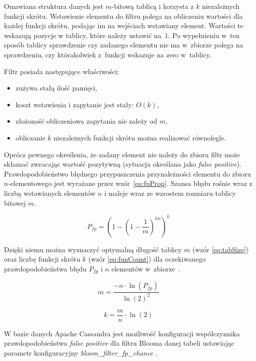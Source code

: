 Omawiana struktura danych jest $m$-bitową tablicą i korzysta z $k$ niezależnych funkcji skrótu.
Wstawienie elementu do filtru polega na obliczeniu wartości dla każdej funkcji skrótu, podając im na wejściach wstawiany element.
Wartości te wskazują pozycje w tablicy, które należy ustawić na~$1$.
Po wypełnieniu w~ten sposób tablicy sprawdzenie czy zadanego elementu nie ma w~zbiorze polega na sprawdzeniu, czy którakolwiek z~funkcji wskazuje na zero w~tablicy.

Filtr posiada następujące właściwości:
\begin{itemize}
    \item zużywa stałą ilość pamięci,
    \item koszt wstawienia i zapytanie jest stały: $O(k)$,
    \item złożoność obliczeniowa zapytania nie zależy od $m$,
    \item obliczanie $k$ niezależnych funkcji skrótu można realizować równolegle.
\end{itemize}

Oprócz pewnego określenia, że zadany element nie należy do zbioru filtr może skłamać zwracając wartość pozytywną (sytuacja określana jako \textit{false positive}).
Prawdopodobieństwo  błędnego  przypuszczenia  przynależności  elementu do zbioru $n$-elementowego jest wyrażane przez wzór~\ref{eq:fpProp}.
Szansa błędu rośnie wraz z liczbą wstawianych elementów $n$ i maleje wraz ze wzrostem rozmiaru tablicy bitowej $m$.

\begin{equation} \label{eq:fpProp}
    P_{fp} = \left(1 - \left(1 - \frac{1}{m}\right)^{kn}\right)^k
\end{equation}

Dzięki niemu można wyznaczyć optymalną długość tablicy $m$ (wzór \ref{eq:tabSize}) oraz liczbę funkcji skrótu $k$ (wzór \ref{eq:funCount}) dla oczekiwanego prawdopodobieństwa błędu $P_{fp}$ i $n$ elementów w~zbiorze~\cite{BloomFilter}.

\begin{equation} \label{eq:tabSize}
    m = \frac{-n \cdot \ln{\left(P_{fp}\right)}}{\ln{(2)}^2}
\end{equation}

\begin{equation} \label{eq:funCount}
    k = \frac{m}{n} \cdot \ln{\left(2\right)}
\end{equation}

W bazie danych Apache Cassandra jest możliwość konfiguracji współczynnika prawdopodobieństwa \textit{false positive} dla filtru Blooma danej tabeli ustawiając parametr konfiguracyjny \textit{bloom\_filter\_fp\_chance} \cite{cassandraBloomConf}.


